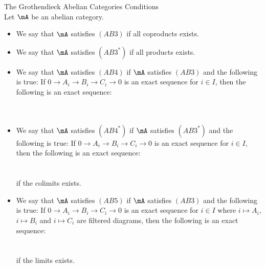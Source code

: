 \documentclass[a4paper]{article}
\begin{document}
\begin{defn}{The Grothendieck Abelian Categories Conditions}{}\\
Let $\mA$ be an abelian category. 
\begin{itemize}
\item We say that $\mA$ satisfies $(AB3)$ if all coproducts exists. 
\item We say that $\mA$ satisfies $(AB3^\ast)$ if all products exists. 
\item We say that $\mA$ satisfies $(AB4)$ if $\mA$ satisfies $(AB3)$ and the following is true: If $0\to A_i\to B_i\to C_i\to 0$ is an exact sequence for $i\in I$, then the following is an exact sequence: \\~\\
\\
\item We say that $\mA$ satisfies $(AB4^\ast)$ if $\mA$ satisfies $(AB3^\ast)$ and the following is true: If $0\to A_i\to B_i\to C_i\to 0$ is an exact sequence for $i\in I$, then the following is an exact sequence: \\~\\
\\
if the colimits exists. 
\item We say that $\mA$ satisfies $(AB5)$ if $\mA$ satisfies $(AB3)$ and the following is true: If $0\to A_i\to B_i\to C_i\to 0$ is an exact sequence for $i\in I$ where $i\mapsto A_i$, $i\mapsto B_i$ and $i\mapsto C_i$ are filtered diagrams, then the following is an exact sequence: \\~\\
\\
if the limits exists. 
\end{itemize}
\end{defn}
\end{document}
